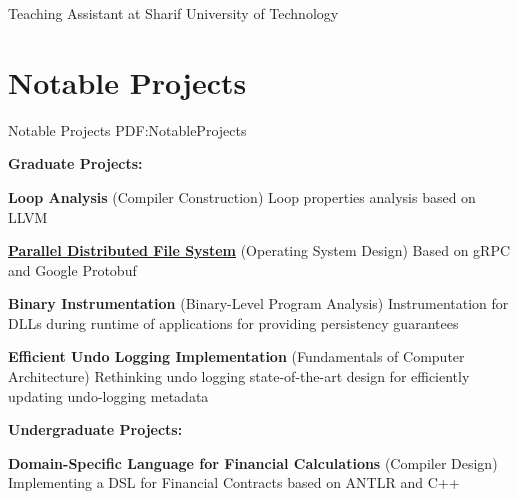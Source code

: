 \documentclass[a4paper,9pt,oneside]{article}
\begin{document}
\begin{body}


\BulletItem Teaching Assistant at Sharif University of Technology







\section
{Notable Projects}
{Notable Projects}
{PDF:NotableProjects}

\textbf{Graduate Projects:}

\BulletItem
\textbf{Loop Analysis}
(Compiler Construction)
\hfill
{}
\SubBulletItem
Loop properties analysis based on LLVM

\BulletItem
\href{https://github.com/arminvakil/PFS}
{\textbf{Parallel Distributed File System}}
(Operating System Design)
\hfill
{}
\SubBulletItem
Based on gRPC and Google Protobuf

\BulletItem
\textbf{Binary Instrumentation}
(Binary-Level Program Analysis)
\hfill
{}
\SubBulletItem
Instrumentation for DLLs during runtime of applications for providing persistency guarantees

\BulletItem
{\textbf{Efficient Undo Logging Implementation}}
(Fundamentals of Computer Architecture)
\hfill
{}
\SubBulletItem
Rethinking undo logging state-of-the-art design for efficiently updating undo-logging metadata

\textbf{Undergraduate Projects:}

\BulletItem
\textbf{Domain-Specific Language for Financial Calculations} (Compiler Design)
\hfill
{}
\SubBulletItem
Implementing a DSL for Financial Contracts based on ANTLR and C++


\end{body}
\end{document}
